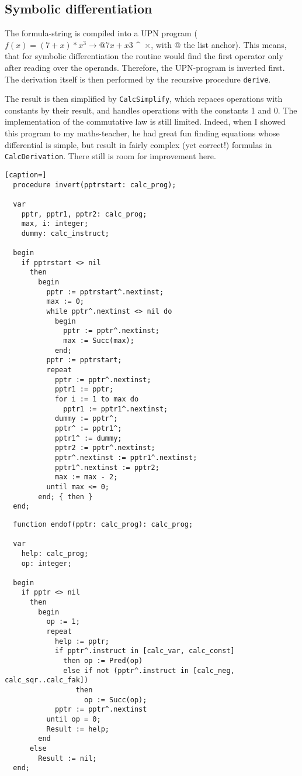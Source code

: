 \begin{refsection}
\subsection{Symbolic differentiation}

The formula-string is compiled into a UPN program (\( f(x) = (7 + x)*x^3 \rightarrow @ 7 x + x 3 \) \textasciicircum\ \( \times \), with @ the list anchor). This means, that for symbolic differentiation the routine would find the first operator only after reading over the operands. Therefore, the UPN-program is inverted first. The derivation itself is then performed by the recursive procedure \texttt{derive}.

The result is then simplified by \texttt{CalcSimplify}, which repaces operations with constants by their result, and handles operations with the constants \num{1} and \num{0}. The implementation of the commutative law is still limited. Indeed, when I showed this program to my maths-teacher, he had great fun finding equations whose differential is simple, but result in fairly complex (yet correct!) formulas in \texttt{CalcDerivation}. There still is room for improvement here.

\begin{lstlisting}[caption=]
  procedure invert(pptrstart: calc_prog);

  var
    pptr, pptr1, pptr2: calc_prog;
    max, i: integer;
    dummy: calc_instruct;

  begin
    if pptrstart <> nil
      then
        begin
          pptr := pptrstart^.nextinst;
          max := 0;
          while pptr^.nextinst <> nil do
            begin
              pptr := pptr^.nextinst;
              max := Succ(max);
            end;
          pptr := pptrstart;
          repeat
            pptr := pptr^.nextinst;
            pptr1 := pptr;
            for i := 1 to max do
              pptr1 := pptr1^.nextinst;
            dummy := pptr^;
            pptr^ := pptr1^;
            pptr1^ := dummy;
            pptr2 := pptr^.nextinst;
            pptr^.nextinst := pptr1^.nextinst;
            pptr1^.nextinst := pptr2;
            max := max - 2;
          until max <= 0;
        end; { then }
  end;
\end{lstlisting}

\begin{lstlisting}
  function endof(pptr: calc_prog): calc_prog;

  var
    help: calc_prog;
    op: integer;

  begin
    if pptr <> nil
      then
        begin
          op := 1;
          repeat
            help := pptr;
            if pptr^.instruct in [calc_var, calc_const]
              then op := Pred(op)
              else if not (pptr^.instruct in [calc_neg, calc_sqr..calc_fak])
                 then
                   op := Succ(op);
            pptr := pptr^.nextinst
          until op = 0;
          Result := help;
        end
      else
        Result := nil;
  end;
\end{lstlisting}


\end{refsection}
